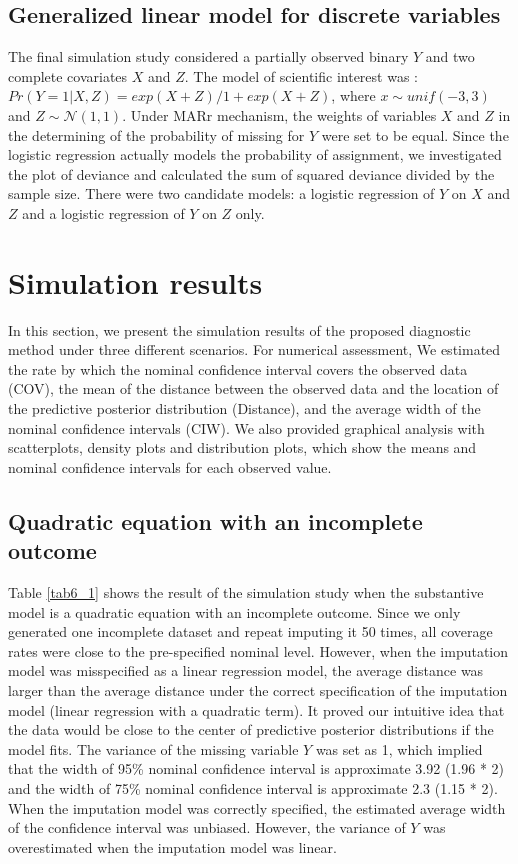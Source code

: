 	\subsection{Generalized linear model for discrete variables}
	The final simulation study considered a partially observed binary $Y$ and two complete covariates $X$ and $Z$. The model of scientific interest was : $Pr (Y = 1 | X, Z) = exp(X + Z) / 1 + exp(X + Z)$,
	where $x \sim unif(-3 , 3)$ and $Z \sim \mathcal{N}(1, 1)$. Under MARr mechanism, the weights of variables $X$ and $Z$ in the determining of the probability of missing for $Y$ were set to be equal. Since the logistic regression actually models the probability of assignment, we investigated the plot of deviance and calculated the sum of squared deviance divided by the sample size. There were two candidate models: a logistic regression of $Y$ on $X$ and $Z$ and a logistic regression of $Y$ on $Z$ only.
	
	\section{Simulation results}
	\label{sec:6.5}
	In this section, we present the simulation results of the proposed diagnostic method under three different scenarios. For numerical assessment, We estimated the rate by which the nominal confidence interval covers the observed data (COV), the mean of the distance between the observed data and the location of the predictive posterior distribution (Distance), and the average width of the nominal confidence intervals (CIW). We also provided graphical analysis with scatterplots, density plots and distribution plots, which show the means and nominal confidence intervals for each observed value.  
	
	\subsection{Quadratic equation with an incomplete outcome}
	Table \ref{tab6_1} shows the result of the simulation study when the substantive model is a quadratic equation with an incomplete outcome. Since we only generated one incomplete dataset and repeat imputing it 50 times, all coverage rates were close to the pre-specified nominal level. However, when the imputation model was misspecified as a linear regression model, the average distance was larger than the average distance under the correct specification of the imputation model (linear regression with a quadratic term). It proved our intuitive idea that the data would be close to the center of predictive posterior distributions if the model fits. The variance of the missing variable $Y$ was set as 1, which implied that the width of 95\% nominal confidence interval is approximate 3.92 (1.96 * 2) and the width of 75\% nominal confidence interval is approximate 2.3 (1.15 * 2). When the imputation model was correctly specified, the estimated average width of the confidence interval was unbiased. However, the variance of $Y$ was overestimated when the imputation model was linear. 
	
